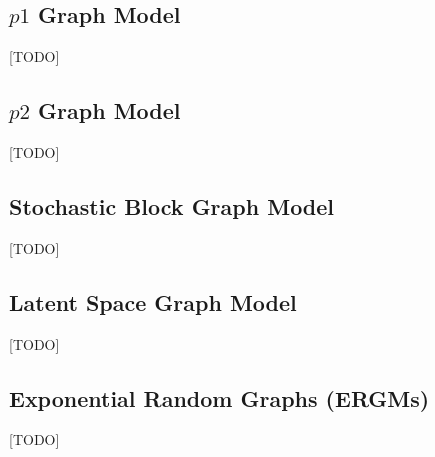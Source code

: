 \subsection{$p1$ Graph Model}
[TODO]

\subsection{$p2$ Graph Model}
[TODO]

\subsection{Stochastic Block Graph Model}
[TODO]

\subsection{Latent Space Graph Model}
[TODO]

\subsection{Exponential Random Graphs (ERGMs)}
[TODO]

\begin{remark}
\end{remark}

